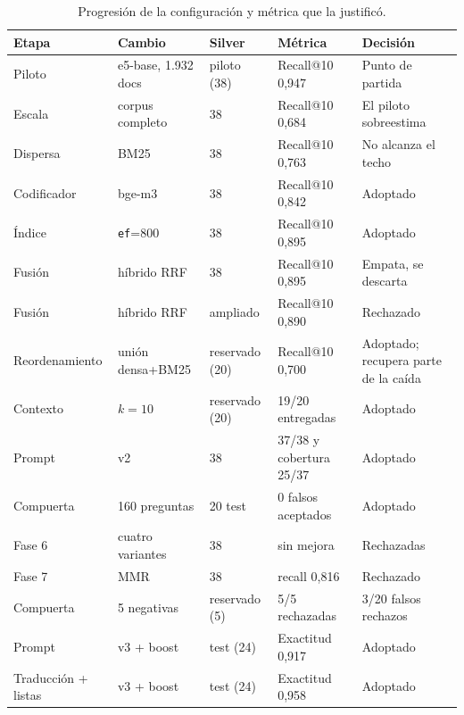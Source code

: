 \begin{table}[t]
\centering
\footnotesize
\caption{Progresi\'on de la configuraci\'on y m\'etrica que la justific\'o.}
\label{tab:progresion}
\begin{tabular}{lllll}
\toprule
Etapa & Cambio & Silver & M\'etrica & Decisi\'on \\
\midrule
Piloto & e5-base, 1.932 docs & piloto (38) & Recall@10 0,947 & Punto de partida \\
Escala & corpus completo & 38 & Recall@10 0,684 & El piloto sobreestima \\
Dispersa & BM25 & 38 & Recall@10 0,763 & No alcanza el techo \\
Codificador & bge-m3 & 38 & Recall@10 0,842 & Adoptado \\
\'Indice & \texttt{ef}=800 & 38 & Recall@10 0,895 & Adoptado \\
Fusi\'on & h\'ibrido RRF & 38 & Recall@10 0,895 & Empata, se descarta \\
Fusi\'on & h\'ibrido RRF & ampliado & Recall@10 0,890 & Rechazado \\
Reordenamiento & uni\'on densa+BM25 & reservado (20) & Recall@10 0,700 & Adoptado; recupera parte de la ca\'ida \\
Contexto & $k=10$ & reservado (20) & 19/20 entregadas & Adoptado \\
Prompt & v2 & 38 & 37/38 y cobertura 25/37 & Adoptado \\
Compuerta & 160 preguntas & 20 test & 0 falsos aceptados & Adoptado \\
Fase 6 & cuatro variantes & 38 & sin mejora & Rechazadas \\
Fase 7 & MMR & 38 & recall 0,816 & Rechazado \\
Compuerta & 5 negativas & reservado (5) & 5/5 rechazadas & 3/20 falsos rechazos \\
Prompt & v3 + boost & test (24) & Exactitud 0,917 & Adoptado \\
Traducci\'on + listas & v3 + boost & test (24) & Exactitud 0,958 & Adoptado \\
\bottomrule
\end{tabular}
\end{table}

